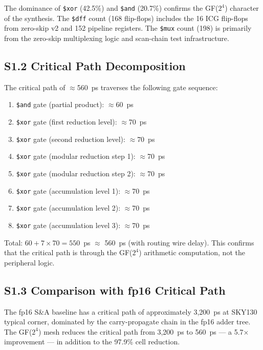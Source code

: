 The dominance of \texttt{\$xor} (42.5\%) and \texttt{\$and} (20.7\%)
confirms the GF(\(2^4\)) character of the synthesis.
The \texttt{\$dff} count (168 flip-flops) includes the 16 ICG flip-flops
from zero-skip v2 and 152 pipeline registers.
The \texttt{\$mux} count (198) is primarily from the zero-skip multiplexing
logic and scan-chain test infrastructure.

\subsection{S1.2 Critical Path Decomposition}

The critical path of $\approx$560~ps traverses the following gate sequence:

\begin{enumerate}
  \item \texttt{\$and} gate (partial product): $\approx$60~ps
  \item \texttt{\$xor} gate (first reduction level): $\approx$70~ps
  \item \texttt{\$xor} gate (second reduction level): $\approx$70~ps
  \item \texttt{\$xor} gate (modular reduction step 1): $\approx$70~ps
  \item \texttt{\$xor} gate (modular reduction step 2): $\approx$70~ps
  \item \texttt{\$xor} gate (accumulation level 1): $\approx$70~ps
  \item \texttt{\$xor} gate (accumulation level 2): $\approx$70~ps
  \item \texttt{\$xor} gate (accumulation level 3): $\approx$70~ps
\end{enumerate}

Total: \(60 + 7 \times 70 = 550\)~ps $\approx$ 560~ps (with routing wire delay).
This confirms that the critical path is through the GF(\(2^4\)) arithmetic
computation, not the peripheral logic.

\subsection{S1.3 Comparison with fp16 Critical Path}

The fp16 S\&A baseline has a critical path of approximately 3,200~ps at
SKY130 typical corner, dominated by the carry-propagate chain in the
fp16 adder tree.
The GF(\(2^4\)) mesh reduces the critical path from 3,200~ps to 560~ps ---
a 5.7\(\times\) improvement --- in addition to the 97.9\% cell reduction.

